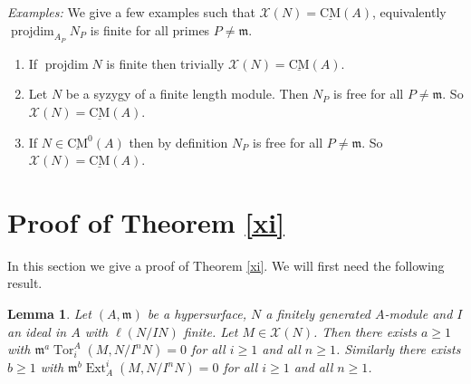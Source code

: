 \documentclass{amsart}
\newcommand{\m}{\mathfrak{m} }
\newcommand{\X}{\mathcal{X} }
\newcommand{\projdim}{\operatorname{projdim}}
\newcommand{\Tor}{\operatorname{Tor}}
\newcommand{\CMS}{\operatorname{\underline{CM}}}
\newcommand{\Ext}{\operatorname{Ext}}
\theoremstyle{plain}
\newtheorem{lemma}[theorem]{Lemma}
\theoremstyle{definition}
\theoremstyle{remark}
\begin{document}
\s\label{ex-X} \emph{Examples:} We give a few examples such that $\X(N) = \CMS(A)$, equivalently  $\projdim_{A_P} N_P$ is finite for all primes $P \neq \m$.
\begin{enumerate}
\item If $\projdim N$ is finite then trivially $\X(N) = \CMS(A)$.
  \item  Let $N$ be a syzygy of a finite length module. Then $N_P$ is free for all $P \neq \m$. So  $\X(N) = \CMS(A)$.
  \item If $N \in \CMS^0(A)$ then by definition $N_P$ is free for all $P \neq \m$. So  $\X(N) = \CMS(A)$.
\end{enumerate}
\section{Proof of Theorem \ref{xi}}
In this section we give a proof of Theorem \ref{xi}. We will first need the following result.
\begin{lemma}\label{ann}
Let $(A,\m)$ be a hypersurface, $N$ a finitely generated $A$-module and $I$ an ideal in $A$ with $\ell(N/IN)$ finite. Let $M \in \X(N)$. Then there exists $a \geq 1$ with
$\m^a\Tor^A_i(M, N/I^{n}N) = 0$ for all $i \geq 1$ and all $n \geq 1$. Similarly there exists $b \geq 1$ with
$\m^b\Ext^i_A(M, N/I^{n}N) = 0$ for all $i \geq 1$ and all $n \geq 1$.
\end{lemma}
\end{document}

